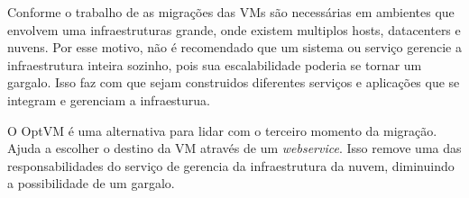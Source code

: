 Conforme o trabalho de \cite{lopez2015virtual} as migrações das VMs são necessárias em ambientes que envolvem uma infraestruturas
grande, onde existem multiplos hosts, datacenters e nuvens. Por esse motivo, não é recomendado que 
um sistema ou serviço gerencie a infraestrutura inteira sozinho, pois sua escalabilidade 
poderia se tornar um gargalo. Isso faz com que sejam construidos diferentes serviços e aplicações 
que se integram e gerenciam a infraesturua.

O OptVM é uma alternativa para lidar com o terceiro momento da migração. 
Ajuda a escolher o destino da VM através de um \textit{webservice}. Isso 
remove uma das responsabilidades do serviço de gerencia da infraestrutura da
nuvem, diminuindo a possibilidade de um gargalo.
